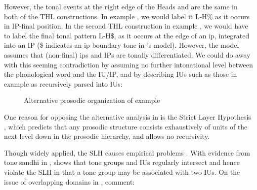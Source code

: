 However, the tonal events at the right edge of the Heads   and  are the same in both of the THL constructions. In  example , we would label it L-H\% as it occurs in IP-final position. In the second THL  construction in example ,  we would have to label the final tonal pattern L-H\$, as it occurs at the edge of an ip, integrated into an IP (\$ indicates an ip boundary tone in \citeauthor{Himmelmann_Preliminary_2018}'s \citeyear{Himmelmann_Preliminary_2018} model). However, the model assumes that (non-final) ips and IPs are tonally differentiated.  We could do away with this seeming contradiction by assuming no further intonational level between the phonological word and the IU/IP, and by describing IUs such as those in example   as recursively parsed into IUs: 


\begin{figure}
	\caption{Alternative prosodic organization of example }
	\label{Alternative prosodic organization}
\end{figure}

One reason for opposing the alternative analysis in   is the Strict Layer Hypothesis  \citep[SLH;][]{selkirk1986, nespor1983prosodic, marina1986prosodic, Vogel_2019}, which predicts that any prosodic structure consists exhaustively of units of the next level down in the prosodic hierarchy, and allows no recursivity. 

Though widely applied, the SLH causes empirical problems \citep[see the discussion in][chapter 8.2]{Ladd_2008}.  With evidence from tone sandhi in , \citet{Chen_1987} shows that tone groups  and IUs  regularly intersect  and hence violate the SLH in that a tone group may be associated with two IUs. On the issue of overlapping domains in , \citeauthor{Hyman_1987} comment:

